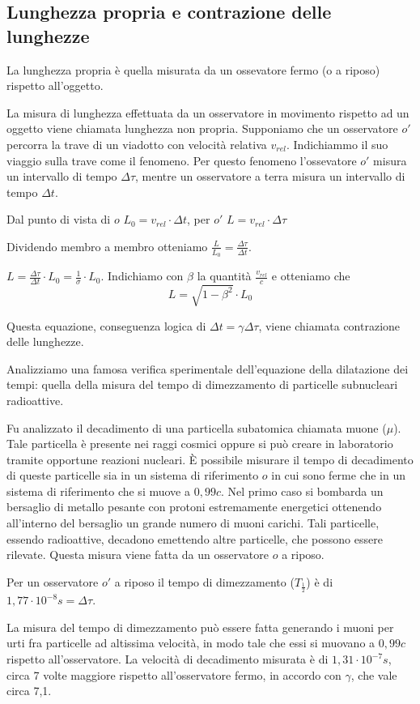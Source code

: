     \subsection{Lunghezza propria e contrazione delle lunghezze}
	\par La lunghezza propria è quella misurata da un ossevatore fermo (o a riposo) rispetto all'oggetto.
	\par La misura di lunghezza effettuata da un osservatore in movimento rispetto ad un oggetto viene chiamata lunghezza non propria.
	Supponiamo che un osservatore $o'$ percorra la trave di un viadotto con velocità relativa $v_{rel}$. Indichiammo il suo viaggio sulla trave
	come il fenomeno. Per questo fenomeno l'ossevatore $o'$ misura un intervallo di tempo $\Delta\tau$, mentre un osservatore a terra misura
	un intervallo di tempo $\Delta t$.
	\par Dal punto di vista di $o$ $L_0=v_{rel}\cdot\Delta t$, per $o'$ $L=v_{rel}\cdot\Delta\tau$
	\par Dividendo membro a membro otteniamo $\frac{L}{L_0} = \frac{\Delta\tau}{\Delta t}$.
	\par $L=\frac{\Delta\tau}{\Delta t}\cdot L_0 = \frac{1}{\sigma}\cdot L_0$. Indichiamo con $\beta$ la quantità $\frac{v_{rel}}{c}$ e otteniamo
	che
	\begin{equation}L=\sqrt{1-\beta^2}\cdot L_0\end{equation}
	\par Questa equazione, conseguenza logica di $\Delta t = \gamma\Delta\tau$, viene chiamata contrazione delle lunghezze.
	\par Analizziamo una famosa verifica sperimentale dell'equazione della dilatazione dei tempi: quella della misura del tempo di dimezzamento
	di particelle subnucleari radioattive.
	\par Fu analizzato il decadimento di una particella subatomica chiamata muone ($\mu$). Tale particella è presente nei raggi cosmici oppure si
	può creare in laboratorio tramite opportune reazioni nucleari. È possibile misurare il tempo di decadimento di queste particelle sia in un 
	sistema di riferimento $o$ in cui sono ferme che in un sistema di riferimento che si muove a $0,99c$. Nel primo caso si bombarda un bersaglio di
	metallo pesante con protoni estremamente energetici ottenendo all'interno del bersaglio un grande numero di muoni carichi. Tali particelle,
	essendo radioattive, decadono emettendo altre particelle, che possono essere rilevate. Questa misura viene fatta da un osservatore $o$ a riposo.
	\par Per un osservatore $o'$ a riposo il tempo di dimezzamento ($T_\frac{1}{2}$) è di $1,77\cdot10^{-8}s=\Delta\tau$.
	\par La misura del tempo di dimezzamento può essere fatta generando i muoni per urti fra particelle ad altissima velocità, in modo tale che essi si
	muovano a $0,99c$ rispetto all'osservatore. La velocità di decadimento misurata è di $1,31\cdot10^{-7}s$, circa 7 volte maggiore rispetto
	all'osservatore fermo, in accordo con $\gamma$, che vale circa 7,1.
